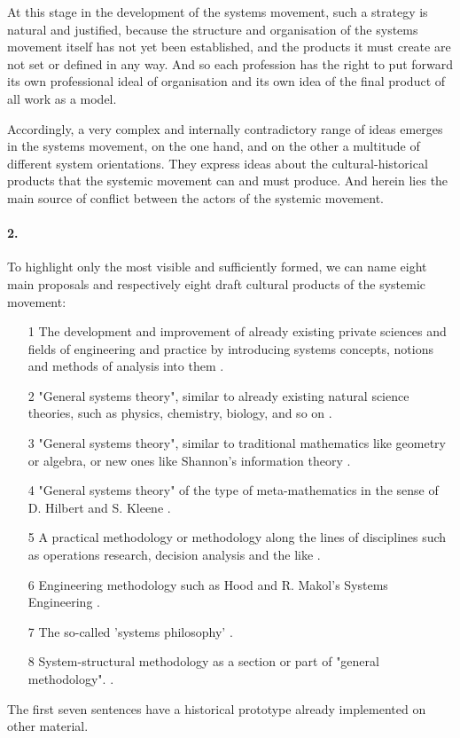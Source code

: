 \documentclass[11pt,a4paper]{article}
\begin{document}
At this stage in the development of the systems movement, such a strategy is
natural and justified, because the structure and organisation of the systems
movement itself has not yet been established, and the products it must create
are not set or defined in any way. And so each profession has the right to put
forward its own professional ideal of organisation and its own idea of the
final product of all work as a model.

Accordingly, a very complex and internally contradictory range of ideas
emerges in the systems movement, on the one hand, and on the other a multitude
of different system orientations. They express ideas about the
cultural-historical products that the systemic movement can and must produce.
And herein lies the main source of conflict between the actors of the systemic
movement.

\paragraph{2.}
To highlight only the most visible and sufficiently formed, we can name eight
main proposals and respectively eight draft cultural products of the systemic
movement:
\begin{itemize}
\item[1] The development and improvement of already existing private sciences
  and fields of engineering and practice by introducing systems concepts,
  notions and methods of analysis into them \cite{Evenko1970, Kosygin1970,
    LargeSystems1971, Lyubishchev1971, Ackoff1972, Guishiani1972}.
\item[2] "General systems theory", similar to already existing natural science
  theories, such as physics, chemistry, biology, and so on \cite{Bogdanov1925,
    Sadovsky1972, Mesarovich1973, Uemov1973, Uemov1978, GTS1966}.
\item[3] "General systems theory", similar to traditional mathematics like
  geometry or algebra, or new ones like Shannon's information theory
  \cite{LargeSystems1971, Zadeh1970, Kalman1971, GTS1966}.
\item[4] "General systems theory" of the type of meta-mathematics in the sense
  of D. Hilbert and S. Kleene \cite{Trends1972, Sadovsky1974}.
\item[5] A practical methodology or methodology along the lines of disciplines
  such as operations research, decision analysis and the like \cite{Quaid1969,
    Optner1969, Evenko1970, Johnson1971}.
\item[6] Engineering methodology such as Hood and R. Makol's Systems
  Engineering \cite{Hood1962, Nikolaev1970, Simon1972}.
\item[7] The so-called 'systems philosophy' \cite{Laszlo1972}.
\item[8] System-structural methodology as a section or part of "general
  methodology". \cite{Shchedrovitsky1964a, Shchedrovitsky1965a,
    Shchedrovitsky1967g, Shchedrovitsky1969b, Spirkin1964, Dubrovsky1971,
    Gushchin1969, Kuzmin1976, Development1975}.
\end{itemize}
The first seven sentences have a historical prototype already implemented on
other material.
\end{document}
